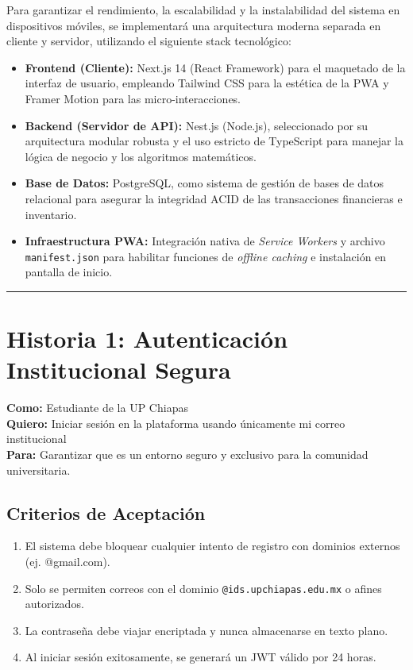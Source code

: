 \documentclass[11pt, letterpaper]{article}
\begin{document}
    Para garantizar el rendimiento, la escalabilidad y la instalabilidad del sistema en dispositivos móviles, se implementará una arquitectura moderna separada en cliente y servidor, utilizando el siguiente stack tecnológico:

    \begin{itemize}
        \item \textbf{Frontend (Cliente):} Next.js 14 (React Framework) para el maquetado de la interfaz de usuario, empleando Tailwind CSS para la estética de la PWA y Framer Motion para las micro-interacciones.
        \item \textbf{Backend (Servidor de API):} Nest.js (Node.js), seleccionado por su arquitectura modular robusta y el uso estricto de TypeScript para manejar la lógica de negocio y los algoritmos matemáticos.
        \item \textbf{Base de Datos:} PostgreSQL, como sistema de gestión de bases de datos relacional para asegurar la integridad ACID de las transacciones financieras e inventario.
        \item \textbf{Infraestructura PWA:} Integración nativa de \textit{Service Workers} y archivo \texttt{manifest.json} para habilitar funciones de \textit{offline caching} e instalación en pantalla de inicio.
    \end{itemize}

    \vspace{1em}
    \hrule
    \vspace{2em}

    \section{Historia 1: Autenticación Institucional Segura}

    \begin{tcolorbox}[colback=purple!5!white,colframe=purple!75!black,title=HU-01: Acceso Exclusivo]
        \textbf{Como:} Estudiante de la UP Chiapas \\
        \textbf{Quiero:} Iniciar sesión en la plataforma usando únicamente mi correo institucional \\
        \textbf{Para:} Garantizar que es un entorno seguro y exclusivo para la comunidad universitaria.
    \end{tcolorbox}

    \subsection{Criterios de Aceptación}
    \begin{enumerate}[label=\bfseries\arabic*.]
        \item El sistema debe bloquear cualquier intento de registro con dominios externos (ej. @gmail.com).
        \item Solo se permiten correos con el dominio \texttt{@ids.upchiapas.edu.mx} o afines autorizados.
        \item La contraseña debe viajar encriptada y nunca almacenarse en texto plano.
        \item Al iniciar sesión exitosamente, se generará un JWT válido por 24 horas.
    \end{enumerate}
\end{document}
